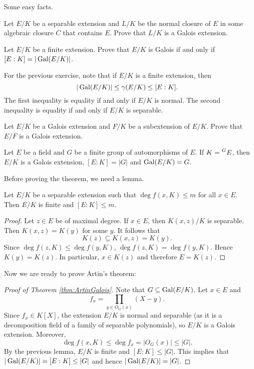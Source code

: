 Some easy facts.

\begin{exercise}
    Let $E/K$ be a separable extension and $L/K$ be the normal 
    closure of $E$ in some algebraic closure $C$
    that contains $E$. Prove that $L/K$ is a Galois extension.
\end{exercise}

\begin{exercise}
    Let $E/K$ be a finite extension. Prove that $E/K$ is Galois
    if and only if $[E:K]=|\operatorname{Gal}(E/K)|$.
\end{exercise}

For the previous exercise, 
note that if $E/K$ is a finite extension, then  
\[
|\operatorname{Gal}(E/K)|\leq\gamma(E/K)\leq [E:K].
\]
The first inequality
is equality if and only if $E/K$ is normal. The second
inequality is equality if and only if $E/K$ is separable.

\begin{exercise}
    Let $E/K$ be a Galois extension and $F/K$ be a subextension of $E/K$. 
    Prove that $E/F$ is a Galois extension. 
\end{exercise}


\begin{theorem}[Artin]
\label{thm:ArtinGalois}
    Let $E$ be a field and $G$ be a finite group of automorphisms of $E$. 
    If $K=\prescript{G}{}{E}$, then $E/K$ is a Galois extension,
    $[E:K]=|G|$ and $\operatorname{Gal}(E/K)=G$. 
\end{theorem}

Before proving the theorem, we need a lemma.

\begin{lemma}
    Let $E/K$ be a separable extension such that $\deg f(x,K)\leq m$
    for all $x\in E$. Then $E/K$ is finite and $[E:K]\leq m$. 
\end{lemma}

\begin{proof}
   Let $z\in E$ be of maximal degree. If $x\in E$, 
   then $K(x,z)/K$ is separable. Then $K(x,z)=K(y)$ for some $y$. 
   It follows that 
   \[
   K(z)\subseteq K(x,z)=K(y).
   \]
   Since 
   $\deg f(z,K)\leq\deg f(y,K)$, 
   $\deg f(z,K)=\deg f(y,K)$. Hence 
   $K(y)=K(z)$. In particular, $x\in K(z)$ and
   therefore $E=K(z)$. 
\end{proof}

Now we are ready to prove Artin's theorem: 

\begin{proof}[Proof of Theorem \ref{thm:ArtinGalois}]
    Note that $G\subseteq\operatorname{Gal}(E/K)$. Let $x\in E$ and 
    \[
    f_x=\prod_{y\in O_G(x)}(X-y).
    \]
    Since $f_x\in K[X]$, the extension $E/K$ is normal and separable (as it is a decomposition
    field of a family of separable polynomials), so $E/K$ is a Galois extension. Moreover, 
    \[
    \deg f(x,K)\leq \deg f_x=|O_G(x)|\leq |G|.
    \]
    By the previous lemma, $E/K$ is finite and $[E:K]\leq |G|$. This
    implies that
    $|\operatorname{Gal}(E/K)|=[E:K]\leq |G|$ and hence $|\operatorname{Gal}(E/K)|=|G|$. 
\end{proof}

